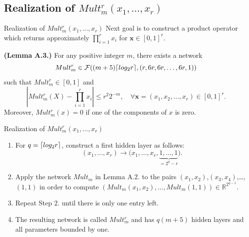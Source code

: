 \documentclass{if-beamer}
\DeclarePairedDelimiter{\ceil}{\lceil}{\rceil}
\begin{document}
\subsection{Realization of $Mult_{m}^{r}(x_{1},\dots,x_{r})$}
\begin{frame}{Realization of $Mult_{m}^{r}(x_{1},\dots,x_{r})$}
Next goal is to construct a product operator which returns approximately $\prod_{i=1}^{r}x_{i}$ for $\textbf{x}\in[0,1]^{r}$.

\begin{tcolorbox}
    \textbf{(Lemma A.3.)}
    For any positive integer $m$, there exists a network 
    \begin{equation*}
        Mult_m^{r} \in \mathcal{F}( (m+5)\ceil{log_{2}r},(r,6r,6r,\dots,6r,1))
    \end{equation*}
    such that $Mult_m^{r}\in[0,1]$ and
    \begin{equation*}
        \left| Mult_m^{r}(X) - \prod_{i=1}^{r}x_{i} \right| \leq r^{2}2^{-m},
        \quad \forall \textbf{x}=(x_{1},x_{2},\dots,x_{r})\in[0,1]^{r}.
    \end{equation*}
    Moreover, $Mult_m^{r}(x)=0$ if one of the components of $x$ is zero.
\end{tcolorbox}

\end{frame}

\begin{frame}{Realization of $Mult_{m}^{r}(x_{1},\dots,x_{r})$}

\begin{enumerate}
    \item For $q=\ceil{log_{2}r}$, construct a first hidden layer as follows:
    \begin{equation*}
        (x_{1},\dots,x_{r})\rightarrow{\big(x_{1},\dots,x_{r},\underbrace{1,\dots,1}_{=2^{q}-r} \big)}.
    \end{equation*}
    \item Apply the network $Mult_m$ in Lemma A.2. to the pairs $(x_1,x_2)$,$(x_3,x_4)$,\dots,$(1,1)$ in order to compute $(Mult_m(x_{1},x_{2}),\dots,Mult_m(1,1))\in\mathbb{R}^{2^{q-1}}$.
    \item Repeat Step 2. until there is only one entry left.
    \item The resulting network is called $Mult_{m}^{r}$ and has $q(m+5)$ hidden layers and all parameters bounded by one.
\end{enumerate}

\end{frame}
\end{document}
